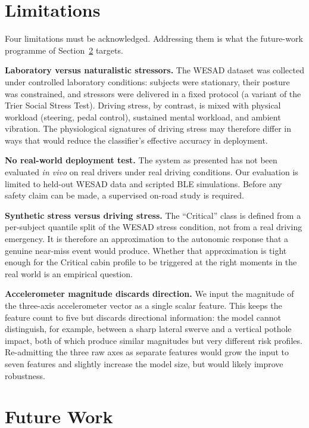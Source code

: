 \section{Limitations}
\label{sec:conclusion-limits}

Four limitations must be acknowledged. Addressing them is what the
future-work programme of Section~\ref{sec:conclusion-future} targets.

\textbf{Laboratory versus naturalistic stressors.} The WESAD
dataset \citep{schmidt2018wesad} was collected under controlled
laboratory conditions: subjects were stationary, their posture was
constrained, and stressors were delivered in a fixed protocol (a
variant of the Trier Social Stress Test). Driving stress, by
contrast, is mixed with physical workload (steering, pedal control),
sustained mental workload, and ambient vibration. The physiological
signatures of driving stress may therefore differ in ways that
would reduce the classifier's effective accuracy in deployment.

\textbf{No real-world deployment test.} The system as presented has
not been evaluated \emph{in vivo} on real drivers under real
driving conditions. Our evaluation is limited to held-out WESAD
data and scripted BLE simulations. Before any safety claim can be
made, a supervised on-road study is required.

\textbf{Synthetic stress versus driving stress.} The ``Critical''
class is defined from a per-subject quantile split of the WESAD
stress condition, not from a real driving emergency. It is
therefore an approximation to the autonomic response that a genuine
near-miss event would produce. Whether that approximation is tight
enough for the Critical cabin profile to be triggered at the right
moments in the real world is an empirical question.

\textbf{Accelerometer magnitude discards direction.} We input the
magnitude of the three-axis accelerometer vector as a single
scalar feature. This keeps the feature count to five but discards
directional information: the model cannot distinguish, for example,
between a sharp lateral swerve and a vertical pothole impact, both
of which produce similar magnitudes but very different risk
profiles. Re-admitting the three raw axes as separate features
would grow the input to seven features and slightly increase the
model size, but would likely improve robustness.

\section{Future Work}
\label{sec:conclusion-future}

